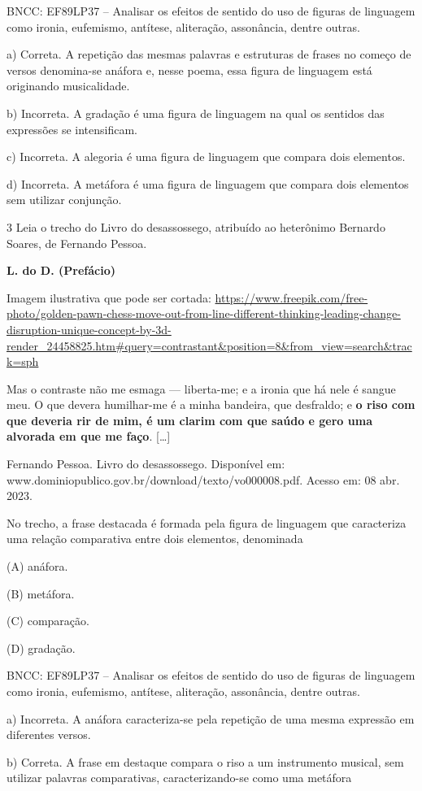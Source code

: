 \begin{itemize}
\begin{itemize}
BNCC: EF89LP37 -- Analisar os efeitos de sentido do uso de figuras de
linguagem como ironia, eufemismo, antítese, aliteração, assonância,
dentre outras.

a) Correta. A repetição das mesmas palavras e estruturas de frases no
começo de versos denomina-se anáfora e, nesse poema, essa figura de
linguagem está originando musicalidade.

b) Incorreta. A gradação é uma figura de linguagem na qual os sentidos
das expressões se intensificam.

c) Incorreta. A alegoria é uma figura de linguagem que compara dois
elementos.

d) Incorreta. A metáfora é uma figura de linguagem que compara dois
elementos sem utilizar conjunção.

\num{3} Leia o trecho do Livro do desassossego, atribuído ao heterônimo
Bernardo Soares, de Fernando Pessoa.

\textbf{L. do D. (Prefácio)}

Imagem ilustrativa que pode ser cortada:
\url{https://www.freepik.com/free-photo/golden-pawn-chess-move-out-from-line-different-thinking-leading-change-disruption-unique-concept-by-3d-render_24458825.htm\#query=contrastant\&position=8\&from_view=search\&track=sph}

Mas o contraste não me esmaga --- liberta-me; e a ironia que há nele é
sangue meu. O que devera humilhar-me é a minha bandeira, que desfraldo;
e \textbf{o riso com que deveria rir de mim, é um clarim com que saúdo e
gero uma alvorada em que me faço}. {[}\ldots{}{]}

Fernando Pessoa. Livro do desassossego. Disponível em:
www.dominiopublico.gov.br/download/texto/vo000008.pdf. Acesso em: 08
abr. 2023.

No trecho, a frase destacada é formada pela figura de linguagem que
caracteriza uma relação comparativa entre dois elementos, denominada

(A) anáfora.

(B) metáfora.

(C) comparação.

(D) gradação.

BNCC: EF89LP37 -- Analisar os efeitos de sentido do uso de figuras de
linguagem como ironia, eufemismo, antítese, aliteração, assonância,
dentre outras.

a) Incorreta. A anáfora caracteriza-se pela repetição de uma mesma
expressão em diferentes versos.

b) Correta. A frase em destaque compara o riso a um instrumento musical,
sem utilizar palavras comparativas, caracterizando-se como uma metáfora


\end{itemize}
\end{itemize}
